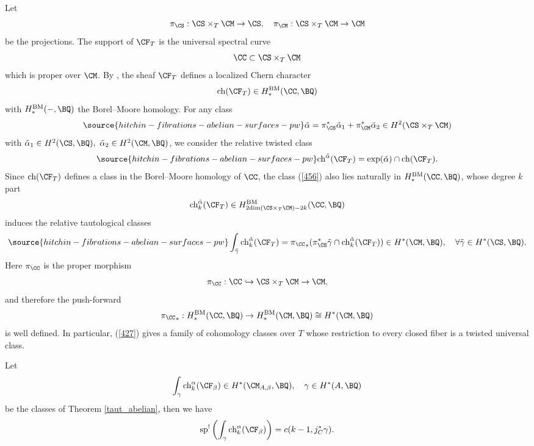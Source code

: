 Let
\[
\pi_\CS: \CS\times_T \CM \to \CS,\quad \pi_\CM: \CS\times_T \CM \to \CM
\]
be the projections. The support of $\CF_T$ is the universal spectral curve
\[
\CC \subset \CS\times_T \CM
\]
which is proper over $\CM$. By \cite{BFM}, the sheaf $\CF_T$ defines a localized Chern character
\[
\mathrm{ch}(\CF_T) \in H^{\mathrm{BM}}_*(\CC, \BQ)
\]
with $H^{\mathrm{BM}}_*(-, \BQ)$ the Borel--Moore homology. For any class
\begin{equation}\label{alphatilde}
\source{hitchin-fibrations-abelian-surfaces-pw}
\tilde{\alpha} = \pi_\CS^* \tilde{\alpha}_1 + \pi_\CM^* \tilde{\alpha}_2 \in H^2(\CS \times_T \CM)
\end{equation}
with $\tilde{\alpha}_1\in H^2(\CS, \BQ),~ \tilde{\alpha}_2\in H^2(\CM, \BQ)$, we consider the relative twisted class
\begin{equation}\label{456}
\source{hitchin-fibrations-abelian-surfaces-pw}
\mathrm{ch}^{\tilde{\alpha}}(\CF_T) = \mathrm{exp}(\tilde{\alpha})\cap \mathrm{ch}(\CF_T).
\end{equation}
Since $\mathrm{ch}(\CF_T)$ defines a class in the Borel--Moore homology of $\CC$, the class (\ref{456}) also lies naturally in $ H^{\mathrm{BM}}_*(\CC, \BQ)$, whose degree $k$ part
\[
 \mathrm{ch}_k^{\tilde{\alpha}}(\CF_T) \in H^{\mathrm{BM}}_{2\mathrm{dim}(\CS\times_T\CM)-2k}(\CC, \BQ)
\]
induces the relative tautological classes
\begin{equation}\label{427}
\source{hitchin-fibrations-abelian-surfaces-pw}
\int_{\tilde{\gamma}} \mathrm{ch}_k^{\tilde{\alpha}}(\CF_T) = {\pi_\CC}_* ( \pi_{\CS}^*\tilde{\gamma} \cap  \mathrm{ch}_k^{\tilde{\alpha}}(\CF_T) ) \in H^*(\CM, \BQ), \quad \forall \tilde{\gamma}\in H^*(\CS, \BQ).
\end{equation}
Here $\pi_\CC$ is the proper morphism
\[
\pi_\CC: \CC \hookrightarrow \CS \times_T \CM \to \CM,
\]
and therefore the push-forward
\[
{\pi_\CC}_*: H^\mathrm{BM}_*(\CC, \BQ) \to H^\mathrm{BM}_*(\CM, \BQ) \cong H^*(\CM, \BQ)
\]
is well defined. In particular, (\ref{427}) gives a family of cohomology classes over $T$ whose restriction to every closed fiber is a twisted universal class.

\begin{prop}
\notready\label{prop4.8}
Let
\[
\int_{\gamma} \mathrm{ch}_k^\alpha (\CF_\beta) \in H^*(\CM_{A,\beta}, \BQ), \quad  \gamma \in H^*(A, \BQ)
\]
be the classes of Theorem \ref{taut_abelian}, then we have
\[
\mathrm{sp}^!\left( \int_{\gamma} \mathrm{ch}_k^\alpha (\CF_\beta) \right) = c(k-1, j_C^*\gamma).
\]
\end{prop}

